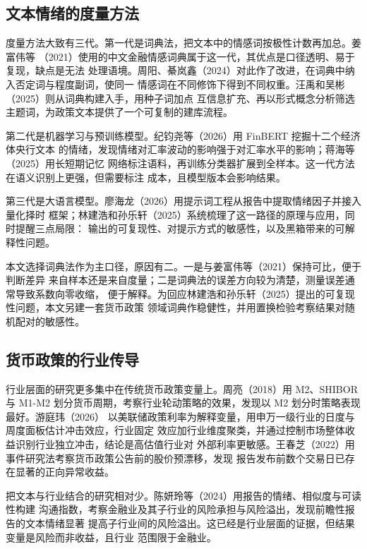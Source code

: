 \subsection{文本情绪的度量方法}

度量方法大致有三代。第一代是词典法，把文本中的情感词按极性计数再加总。姜富伟等
（2021）使用的中文金融情感词典属于这一代，其优点是口径透明、易于复现，缺点是无法
处理语境。周阳、綦岚鑫（2024）对此作了改进，在词典中纳入否定词与程度副词，使同一
情感词在不同修饰下得到不同权重。汪禹和吴彬（2025）则从词典构建入手，用种子词加点
互信息扩充、再以形式概念分析筛选主题词，为政策文本提供了一个可复制的建库流程。

第二代是机器学习与预训练模型。纪钧尧等（2026）用 FinBERT 挖掘十二个经济体央行文本
的情绪，发现情绪对汇率波动的影响强于对汇率水平的影响；蒋海等（2025）用长短期记忆
网络标注语料，再训练分类器扩展到全样本。这一代方法在语义识别上更强，但需要标注
成本，且模型版本会影响结果。

第三代是大语言模型。廖海龙（2026）用提示词工程从报告中提取情绪因子并接入量化择时
框架；林建浩和孙乐轩（2025）系统梳理了这一路径的原理与应用，同时提醒三点局限：
输出的可复现性、对提示方式的敏感性，以及黑箱带来的可解释性问题。

本文选择词典法作为主口径，原因有二。一是与姜富伟等（2021）保持可比，便于判断差异
来自样本还是来自度量；二是词典法的误差方向较为清楚，测量误差通常导致系数向零收缩，
便于解释。为回应林建浩和孙乐轩（2025）提出的可复现性问题，本文另建一套货币政策
领域词典作稳健性，并用置换检验考察结果对随机配对的敏感性。

\subsection{货币政策的行业传导}

行业层面的研究更多集中在传统货币政策变量上。周亮（2018）用 M2、SHIBOR 与 M1-M2
划分货币周期，考察行业轮动策略的效果，发现以 M2 划分时策略表现最好。游庭玮（2026）
以美联储政策利率为解释变量，用申万一级行业的日度与周度面板估计冲击效应，行业固定
效应加行业维度聚类，并通过控制市场整体收益识别行业独立冲击，结论是高估值行业对
外部利率更敏感。王春芝（2022）用事件研究法考察货币政策公告前的股价预漂移，发现
报告发布前数个交易日已存在显著的正向异常收益。

把文本与行业结合的研究相对少。陈妍玲等（2024）用报告的情绪、相似度与可读性构建
沟通指数，考察金融业及其子行业的风险承担与风险溢出，发现前瞻性报告的文本情绪显著
提高子行业间的风险溢出。这已经是行业层面的证据，但结果变量是风险而非收益，且行业
范围限于金融业。

